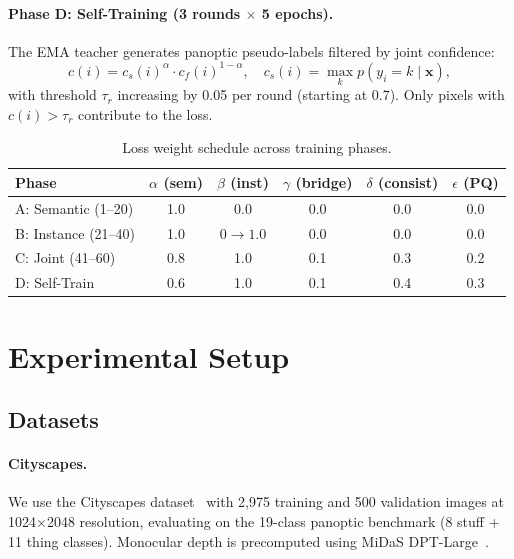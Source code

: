 \documentclass{article}
\begin{document}
\paragraph{Phase D: Self-Training (3 rounds $\times$ 5 epochs).}
The EMA teacher generates panoptic pseudo-labels filtered by joint confidence:
\begin{equation}
c(i) = c_s(i)^\alpha \cdot c_f(i)^{1-\alpha}, \quad c_s(i) = \max_k p(y_i = k \mid \mathbf{x}),
\label{eq:confidence}
\end{equation}
with threshold $\tau_r$ increasing by 0.05 per round (starting at 0.7). Only pixels with $c(i) > \tau_r$ contribute to the loss.

\begin{table}[t]
\centering
\caption{Loss weight schedule across training phases.}
\label{tab:curriculum}
\begin{tabular}{lccccc}
\toprule
\textbf{Phase} & $\alpha$ (sem) & $\beta$ (inst) & $\gamma$ (bridge) & $\delta$ (consist) & $\epsilon$ (PQ) \\
\midrule
A: Semantic (1--20) & 1.0 & 0.0 & 0.0 & 0.0 & 0.0 \\
B: Instance (21--40) & 1.0 & $0 \rightarrow 1.0$ & 0.0 & 0.0 & 0.0 \\
C: Joint (41--60) & 0.8 & 1.0 & 0.1 & 0.3 & 0.2 \\
D: Self-Train & 0.6 & 1.0 & 0.1 & 0.4 & 0.3 \\
\bottomrule
\end{tabular}
\end{table}


\section{Experimental Setup}
\label{sec:experiments}

\subsection{Datasets}

\paragraph{Cityscapes.}
We use the Cityscapes dataset~\cite{cordts2016cityscapes} with 2,975 training and 500 validation images at 1024$\times$2048 resolution, evaluating on the 19-class panoptic benchmark (8 stuff + 11 thing classes). Monocular depth is precomputed using MiDaS DPT-Large~\cite{ranftl2020midas}.
\end{document}
